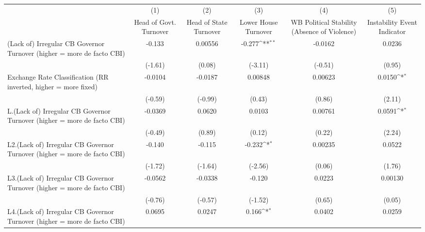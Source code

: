 {
\def\sym#1{\ifmmode^{#1}\else\(^{#1}\)\fi}
\begin{longtable}{l*{5}{c}}
\toprule\endfirsthead\midrule\endhead\midrule\endfoot\endlastfoot
                &\multicolumn{1}{c}{(1)}&\multicolumn{1}{c}{(2)}&\multicolumn{1}{c}{(3)}&\multicolumn{1}{c}{(4)}&\multicolumn{1}{c}{(5)}\\
                &\multicolumn{1}{c}{Head of Govt. Turnover}&\multicolumn{1}{c}{Head of State Turnover}&\multicolumn{1}{c}{Lower House Turnover}&\multicolumn{1}{c}{WB Political Stability (Absence of Violence)}&\multicolumn{1}{c}{Instability Event Indicator}\\
\midrule
(Lack of) Irregular CB Governor Turnover (higher = more de facto CBI)&   -0.133         &  0.00556         &   -0.277\sym{**} &  -0.0162         &   0.0236         \\
                &  (-1.61)         &   (0.08)         &  (-3.11)         &  (-0.51)         &   (0.95)         \\
\addlinespace
Exchange Rate Classification (RR inverted, higher = more fixed)&  -0.0104         &  -0.0187         &  0.00848         &  0.00623         &   0.0150\sym{*}  \\
                &  (-0.59)         &  (-0.99)         &   (0.43)         &   (0.86)         &   (2.11)         \\
\addlinespace
L.(Lack of) Irregular CB Governor Turnover (higher = more de facto CBI)&  -0.0369         &   0.0620         &   0.0103         &  0.00761         &   0.0591\sym{*}  \\
                &  (-0.49)         &   (0.89)         &   (0.12)         &   (0.22)         &   (2.24)         \\
\addlinespace
L2.(Lack of) Irregular CB Governor Turnover (higher = more de facto CBI)&   -0.140         &   -0.115         &   -0.232\sym{*}  &  0.00235         &   0.0522         \\
                &  (-1.72)         &  (-1.64)         &  (-2.56)         &   (0.06)         &   (1.76)         \\
\addlinespace
L3.(Lack of) Irregular CB Governor Turnover (higher = more de facto CBI)&  -0.0562         &  -0.0338         &   -0.120         &   0.0223         &  0.00130         \\
                &  (-0.76)         &  (-0.57)         &  (-1.52)         &   (0.65)         &   (0.05)         \\
\addlinespace
L4.(Lack of) Irregular CB Governor Turnover (higher = more de facto CBI)&   0.0695         &   0.0247         &    0.166\sym{*}  &   0.0402         &   0.0259         \\

\end{longtable}}

